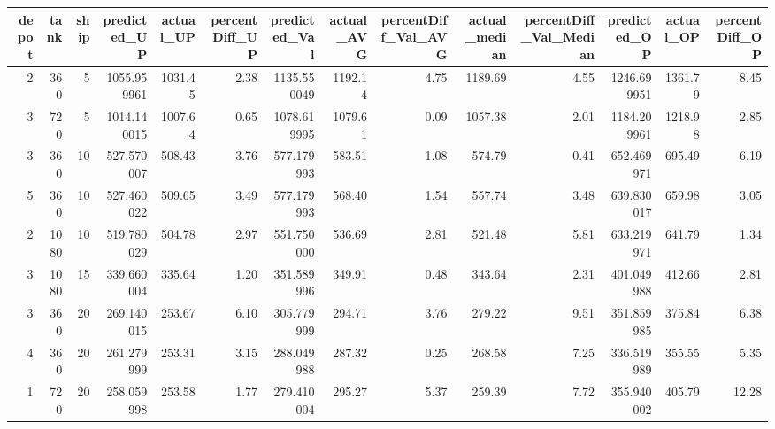 \begin{tabular}{rrrrrrrrrrrrrr}
\toprule
 depot &  tank &  ship &  predicted\_UP &  actual\_UP &  percentDiff\_UP &  predicted\_Val &  actual\_AVG &  percentDiff\_Val\_AVG &  actual\_median &  percentDiff\_Val\_Median &  predicted\_OP &  actual\_OP &  percentDiff\_OP \\
\midrule
     2 &   360 &     5 &   1055.959961 &    1031.45 &            2.38 &    1135.550049 &     1192.14 &                 4.75 &        1189.69 &                    4.55 &   1246.699951 &    1361.79 &            8.45 \\
     3 &   720 &     5 &   1014.140015 &    1007.64 &            0.65 &    1078.619995 &     1079.61 &                 0.09 &        1057.38 &                    2.01 &   1184.209961 &    1218.98 &            2.85 \\
     3 &   360 &    10 &    527.570007 &     508.43 &            3.76 &     577.179993 &      583.51 &                 1.08 &         574.79 &                    0.41 &    652.469971 &     695.49 &            6.19 \\
     5 &   360 &    10 &    527.460022 &     509.65 &            3.49 &     577.179993 &      568.40 &                 1.54 &         557.74 &                    3.48 &    639.830017 &     659.98 &            3.05 \\
     2 &  1080 &    10 &    519.780029 &     504.78 &            2.97 &     551.750000 &      536.69 &                 2.81 &         521.48 &                    5.81 &    633.219971 &     641.79 &            1.34 \\
     3 &  1080 &    15 &    339.660004 &     335.64 &            1.20 &     351.589996 &      349.91 &                 0.48 &         343.64 &                    2.31 &    401.049988 &     412.66 &            2.81 \\
     3 &   360 &    20 &    269.140015 &     253.67 &            6.10 &     305.779999 &      294.71 &                 3.76 &         279.22 &                    9.51 &    351.859985 &     375.84 &            6.38 \\
     4 &   360 &    20 &    261.279999 &     253.31 &            3.15 &     288.049988 &      287.32 &                 0.25 &         268.58 &                    7.25 &    336.519989 &     355.55 &            5.35 \\
     1 &   720 &    20 &    258.059998 &     253.58 &            1.77 &     279.410004 &      295.27 &                 5.37 &         259.39 &                    7.72 &    355.940002 &     405.79 &           12.28 \\

\end{tabular}

